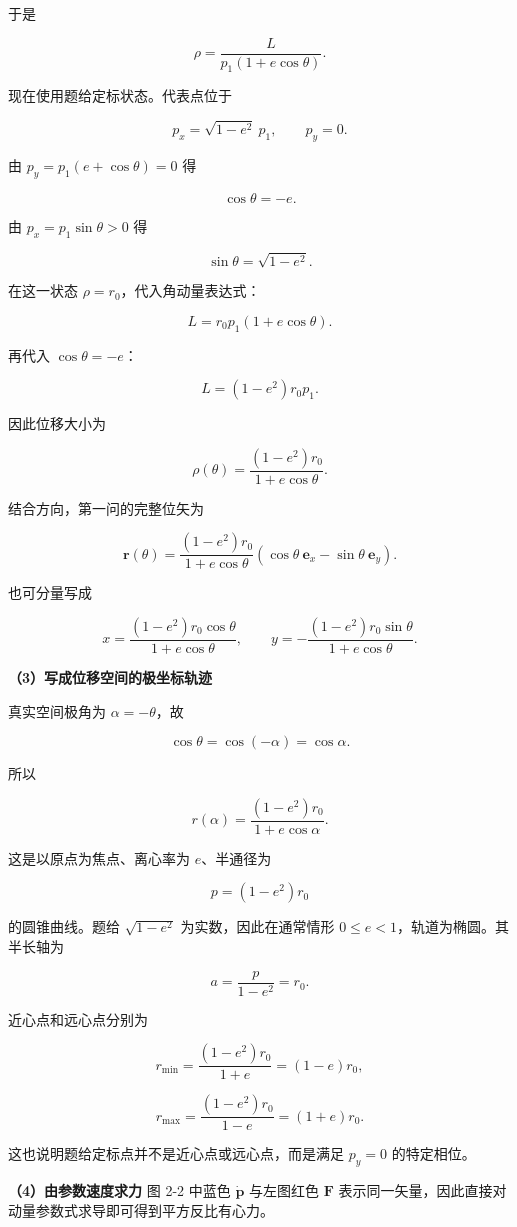 \documentclass[12pt,a4paper,UTF8]{ctexart}
\begin{document}
于是

\[\rho=\frac{L}{p_1(1+e\cos\theta)}.\]

现在使用题给定标状态。代表点位于

\[p_x=\sqrt{1-e^2}\ p_1,\qquad p_y=0.\]

由 \(p_y=p_1(e+\cos\theta)=0\) 得

\[\cos\theta=-e.\]

由 \(p_x=p_1\sin\theta>0\) 得

\[\sin\theta=\sqrt{1-e^2}.\]

在这一状态 \(\rho=r_0\)，代入角动量表达式：

\[L=r_0p_1(1+e\cos\theta).\]

再代入 \(\cos\theta=-e\)：

\[\boxed{L=(1-e^2)r_0p_1}.\]

因此位移大小为

\[\boxed{\rho(\theta)=\frac{(1-e^2)r_0}{1+e\cos\theta}}.\]

结合方向，第一问的完整位矢为

\[\boxed{
\bm r(\theta)=
\frac{(1-e^2)r_0}{1+e\cos\theta}
\left(\cos\theta\ \bm e_x-\sin\theta\ \bm e_y\right)
}.\]

也可分量写成

\[\boxed{
x=\frac{(1-e^2)r_0\cos\theta}{1+e\cos\theta},
\qquad
y=-\frac{(1-e^2)r_0\sin\theta}{1+e\cos\theta}
}.\]

\textbf{（3）写成位移空间的极坐标轨迹}

真实空间极角为 \(\alpha=-\theta\)，故

\[\cos\theta=\cos(-\alpha)=\cos\alpha.\]

所以

\[\boxed{
r(\alpha)=\frac{(1-e^2)r_0}{1+e\cos\alpha}
}.\]

这是以原点为焦点、离心率为 \(e\)、半通径为

\[p=(1-e^2)r_0\]

的圆锥曲线。题给 \(\sqrt{1-e^2}\) 为实数，因此在通常情形
\(0\le e<1\)，轨道为椭圆。其半长轴为

\[a=\frac{p}{1-e^2}=r_0.\]

近心点和远心点分别为

\[r_{\min}=\frac{(1-e^2)r_0}{1+e}=(1-e)r_0,\]

\[r_{\max}=\frac{(1-e^2)r_0}{1-e}=(1+e)r_0.\]

这也说明题给定标点并不是近心点或远心点，而是满足 \(p_y=0\) 的特定相位。

\textbf{（4）由参数速度求力} 图 2-2 中蓝色 \(\dot{\bm p}\) 与左图红色
\(\bm F\) 表示同一矢量，因此直接对动量参数式求导即可得到平方反比有心力。
\end{document}
